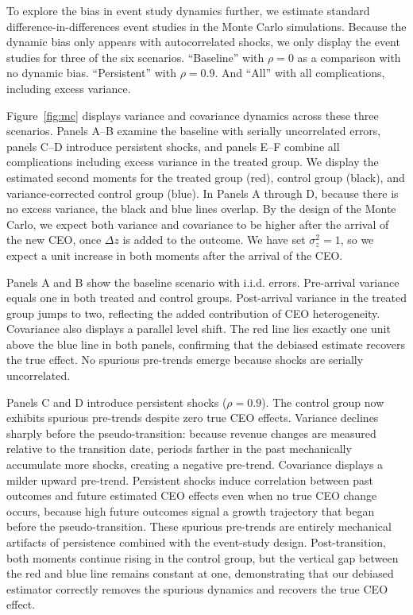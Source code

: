 \documentclass[11pt,a4paper]{article}
\begin{document}
To explore the bias in event study dynamics further, we estimate standard difference-in-differences event studies \citep{Callaway2021JoLE} in the Monte Carlo simulations. Because the dynamic bias only appears with autocorrelated shocks, we only display the event studies for three of the six scenarios. ``Baseline'' with $\rho=0$ as a comparison with no dynamic bias. ``Persistent'' with $\rho=0.9$. And ``All'' with all complications, including excess variance.

Figure~\ref{fig:mc} displays variance and covariance dynamics across these three scenarios. Panels A--B examine the baseline with serially uncorrelated errors, panels C--D introduce persistent shocks, and panels E--F combine all complications including excess variance in the treated group. We display the estimated second moments for the treated group (red), control group (black), and variance-corrected control group (blue). In Panels A through D, because there is no excess variance, the black and blue lines overlap. By the design of the Monte Carlo, we expect both variance and covariance to be higher after the arrival of the new CEO, once $\Delta z$ is added to the outcome. We have set $\sigma^2_z=1$, so we expect a unit increase in both moments after the arrival of the CEO.

Panels A and B show the baseline scenario with i.i.d. errors. Pre-arrival variance equals one in both treated and control groups. Post-arrival variance in the treated group jumps to two, reflecting the added contribution of CEO heterogeneity. Covariance also displays a parallel level shift. The red line lies exactly one unit above the blue line in both panels, confirming that the debiased estimate recovers the true effect. No spurious pre-trends emerge because shocks are serially uncorrelated. 

Panels C and D introduce persistent shocks ($\rho=0.9$). The control group now exhibits spurious pre-trends despite zero true CEO effects. Variance declines sharply before the pseudo-transition: because revenue changes are measured relative to the transition date, periods farther in the past mechanically accumulate more shocks, creating a negative pre-trend. Covariance displays a milder upward pre-trend. Persistent shocks induce correlation between past outcomes and future estimated CEO effects even when no true CEO change occurs, because high future outcomes signal a growth trajectory that began before the pseudo-transition. These spurious pre-trends are entirely mechanical artifacts of persistence combined with the event-study design. Post-transition, both moments continue rising in the control group, but the vertical gap between the red and blue line remains constant at one, demonstrating that our debiased estimator correctly removes the spurious dynamics and recovers the true CEO effect.
\end{document}
